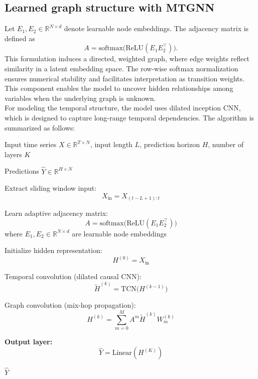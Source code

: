 \documentclass{article}
\begin{document}
\subsection{Learned graph structure with MTGNN}

Let $E_1, E_2 \in \mathbb{R}^{N \times d}$ denote learnable node embeddings. 
The adjacency matrix is defined as
\[
A = \mathrm{softmax}\big(\mathrm{ReLU}(E_1 E_2^\top)\big).
\]
This formulation induces a directed, weighted graph, where edge weights reflect similarity in a latent embedding space. The row-wise softmax normalization ensures numerical stability and facilitates interpretation as transition weights. This component enables the model to uncover hidden relationships among variables when the underlying graph is unknown.\\

\noindent 
For modeling the temporal structure,
the model uses dilated inception CNN,
which is designed to capture long-range temporal dependencies.
The algorithm is summarized as follows:
\begin{algorithm}[H]
\caption{MTGNN for Multivariate Time Series Forecasting \citep{wu2020connecting}}
\label{alg:mtgnn}
\begin{algorithmic}[1]
\REQUIRE Input time series $X \in \mathbb{R}^{T \times N}$, 
input length $L$, prediction horizon $H$, 
number of layers $K$

\ENSURE Predictions $\hat{Y} \in \mathbb{R}^{H \times N}$

\STATE Extract sliding window input:
\[
X_{\text{in}} = X_{(t-L+1):t}
\]

\STATE Learn adaptive adjacency matrix:
\[
A = \text{softmax}\big(\text{ReLU}(E_1 E_2^\top)\big)
\]
where $E_1, E_2 \in \mathbb{R}^{N \times d}$ are learnable node embeddings

\STATE Initialize hidden representation:
\[
H^{(0)} = X_{\text{in}}
\]


    \STATE Temporal convolution (dilated causal CNN):
    \[
    \tilde{H}^{(k)} = \text{TCN}\big(H^{(k-1)}\big)
    \]

    \STATE Graph convolution (mix-hop propagation):
    \[
    H^{(k)} = \sum_{m=0}^{M} A^m \tilde{H}^{(k)} W_m^{(k)}
    \]

\ENDFOR

\STATE \textbf{Output layer:}
\[
\hat{Y} = \text{Linear}(H^{(K)})
\]

\RETURN $\hat{Y}$
\end{algorithmic}
\end{algorithm}
\end{document}
